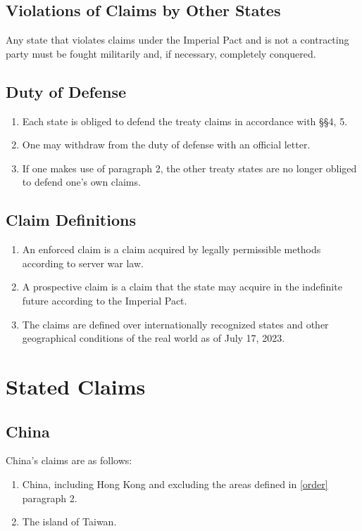 \documentclass{article}
\begin{document}
\subsection{Violations of Claims by Other States}
Any state that violates claims under the Imperial Pact and is not a contracting party must be fought militarily and, if necessary, completely conquered.

\subsection{Duty of Defense}
\begin{enumerate}[(1)]
    \item Each state is obliged to defend the treaty claims in accordance with §§4, 5.
    \item One may withdraw from the duty of defense with an official letter.
    \item If one makes use of paragraph 2, the other treaty states are no longer obliged to defend one's own claims.
\end{enumerate}

\subsection{Claim Definitions}
\begin{enumerate}[(1)]
    \item An enforced claim is a claim acquired by legally permissible methods according to server war law.
    \item A prospective claim is a claim that the state may acquire in the indefinite future according to the Imperial Pact.
    \item The claims are defined over internationally recognized states and other geographical conditions of the real world as of July 17, 2023.
\end{enumerate}

\section{Stated Claims}

\subsection{China}
China's claims are as follows:
\begin{enumerate}
    \item China, including Hong Kong and excluding the areas defined in \ref{order} paragraph 2.
    \item The island of Taiwan.
\end{enumerate}
\end{document}
